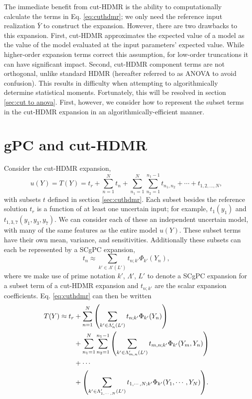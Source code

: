 The immediate benefit from cut-HDMR is the ability to computationally calculate the terms in Eq.
\ref{eq:cuthdmr};
we only need the reference input realization $\bar Y$ to construct the expansion.  However, there are two
drawbacks to this expansion.  First, cut-HDMR approximates the expected value of a model as the value of the
model evaluated at the input parameters' expected value.  While higher-order expansion terms correct this
assumption, for low-order truncations it can have significant impact.
Second,
cut-HDMR component terms are not orthogonal, unlike standard HDMR (hereafter referred to as ANOVA to avoid
confusion).  This results in difficulty
when attempting to algorithmically determine statistical moments.  Fortunately, this will be resolved in
section \ref{sec:cut to anova}.  First, however, we consider how to represent the subset terms in the cut-HDMR
expansion in an algorithmically-efficient manner.

\section{gPC and cut-HDMR}\label{sec:gPC cut}
Consider the cut-HDMR expansion,
\begin{equation}
  u(Y) = T(Y) = t_r + \sum_{n=1}^N t_n + \sum_{n_1=1}^N \sum_{n_2=1}^{n_1-1}
  t_{n_1,n_2}+\cdots+t_{1,2,\ldots,N},
\end{equation}
with subsets $t$ defined in section \ref{sec:cuthdmr}. Each subset besides the reference solution $t_r$ is a
function of at least one uncertain input; for example, $t_1(y_1)$ and $t_{1,3,7}(y_1,y_3,y_7)$.  We can
consider each of these an independent uncertain model, with many of the same features as the entire model
$u(Y)$.  These subset terms have their own mean, variance, and sensitivities.  Additionally
these subsets can each be represented by a SCgPC expansion,
\begin{equation}
  t_n \approx \sum_{k'\in\Lambda'(L')} t_{n;k'}\Phi_{k'}(Y_n),
\end{equation}
where we make use of prime notation $k'$, $\Lambda'$, $L'$ to denote a SCgPC expansion
for a subset term of a cut-HDMR expansion and $t_{n;k'}$ are the scalar expansion coefficients.  Eq.
\ref{eq:cuthdmr} can then be written
\begin{align}\label{eq:cut and gpc}
  T(Y) \approx t_r &+ \sum_{n=1}^N \qty(\sum_{k'\in\Lambda_n'(L')} t_{n;k'}\Phi_{k'}(Y_n)) \\ \nonumber
  &+ \sum_{n_1=1}^N \sum_{n_2=1}^{n_1-1} \qty(\sum_{k'\in\Lambda_{m,n}'(L')} t_{m,n;k'}\Phi_{k'}(Y_m,Y_n)) \\
  \nonumber &+\cdots \\ \nonumber
  &+ \qty(\sum_{k'\in\Lambda_{1,\cdots,N}'(L')} t_{1,\cdots,N;k'}\Phi_{k'}(Y_1,\cdots,Y_N)).
\end{align}

